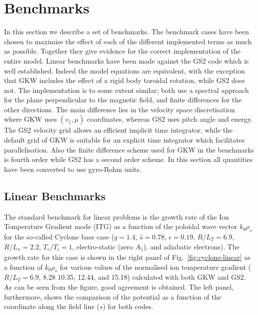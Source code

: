 \chapter{Benchmarks} 




In this section we describe a set of benchmarks. 
The benchmark cases have been chosen to maximise the effect of each of the different implemented 
terms as much as possible.
Together they give evidence for the correct implementation of the entire model. 
Linear benchmarks have been made against the GS2 code which is well established. 
Indeed the model equations are equivalent, with the exception that GKW includes the effect of a 
rigid body toroidal rotation, while GS2 does not. The implementation is to some extent similar;
both 
use a spectral approach for the plane perpendicular to the magnetic field, and finite differences for 
the other directions. 
The main difference lies in the velocity space discretisation where GKW uses $(v_\parallel, \mu)$
coordinates, whereas GS2 uses pitch angle and energy.  The GS2 velocity grid allows an efficient
implicit time integrator, while the default grid of GKW is suitable for an explicit time integrator
which facilitates parallelisation.  Also the finite difference scheme used
for GKW in the benchmarks is fourth order while GS2 has a second order scheme. 
In this section all quantities have been converted to use gyro-Bohm units. 

\section{Linear Benchmarks\label{linearbenchmarks}} 

The standard benchmark for linear problems is the growth rate of the Ion Temperature Gradient 
mode (ITG) as a function of the poloidal wave vector $k_\theta \rho_s$ for the so-called 
Cyclone base case \cite{DIM00} ($q = 1.4$, $\hat s = 0.78$, $\epsilon = 0.19$, $R / L_T = 6.9$, 
$R/L_n = 2.2$, $T_e / T_i = 1$, electro-static (zero $A_\parallel$), and adiabatic electrons). 
The growth rate for this case is shown in the right panel of Fig.~\ref{fig:cyclone-linear} as a function 
of $k_\theta\rho_s$ for various values of the normalised ion temperature gradient ($R/L_T = 6.9$,
8.28 10.35, 12.44, and 15.18) calculated with both GKW and GS2. 
As can be seen from the figure, good agreement is obtained. 
The left panel, furthermore, shows the comparison of the potential as a function of the coordinate 
along the field line ($s$) for both codes. 

